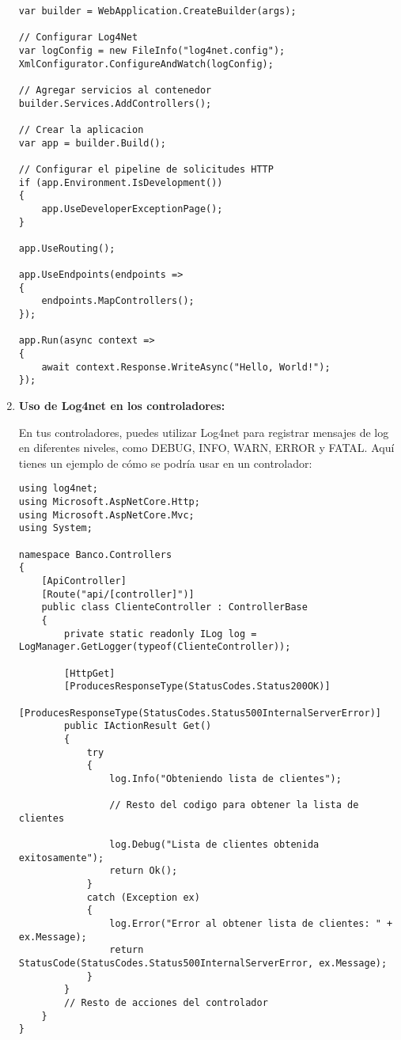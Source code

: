\documentclass[executivepaper]{article}
\begin{document}
\begin{enumerate}
\begin{lstlisting}
var builder = WebApplication.CreateBuilder(args);

// Configurar Log4Net
var logConfig = new FileInfo("log4net.config");
XmlConfigurator.ConfigureAndWatch(logConfig);

// Agregar servicios al contenedor
builder.Services.AddControllers();

// Crear la aplicacion
var app = builder.Build();

// Configurar el pipeline de solicitudes HTTP
if (app.Environment.IsDevelopment())
{
    app.UseDeveloperExceptionPage();
}

app.UseRouting();

app.UseEndpoints(endpoints =>
{
    endpoints.MapControllers();
});

app.Run(async context =>
{
    await context.Response.WriteAsync("Hello, World!");
});    
\end{lstlisting}
  
  \item \textbf{Uso de Log4net en los controladores:}
  
  En tus controladores, puedes utilizar Log4net para registrar mensajes de log en diferentes niveles, como DEBUG, INFO, WARN, ERROR y FATAL. Aquí tienes un ejemplo de cómo se podría usar en un controlador:
  
\begin{lstlisting}
using log4net;
using Microsoft.AspNetCore.Http;
using Microsoft.AspNetCore.Mvc;
using System;

namespace Banco.Controllers
{
    [ApiController]
    [Route("api/[controller]")]
    public class ClienteController : ControllerBase
    {
        private static readonly ILog log = LogManager.GetLogger(typeof(ClienteController));

        [HttpGet]
        [ProducesResponseType(StatusCodes.Status200OK)]
        [ProducesResponseType(StatusCodes.Status500InternalServerError)]
        public IActionResult Get()
        {
            try
            {
                log.Info("Obteniendo lista de clientes");

                // Resto del codigo para obtener la lista de clientes

                log.Debug("Lista de clientes obtenida exitosamente");
                return Ok();
            }
            catch (Exception ex)
            {
                log.Error("Error al obtener lista de clientes: " + ex.Message);
                return StatusCode(StatusCodes.Status500InternalServerError, ex.Message);
            }
        }
        // Resto de acciones del controlador
    }
}
\end{lstlisting}
\end{enumerate}
\end{document}
